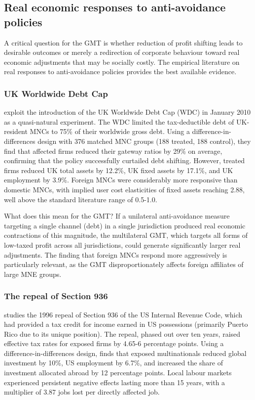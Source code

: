 \documentclass[11pt,a4paper]{article}
\begin{document}
\subsection{Real economic responses to anti-avoidance policies}\label{sec:real}

A critical question for the GMT is whether reduction of profit shifting leads to desirable outcomes or merely a redirection of corporate behaviour toward real economic adjustments that may be socially costly. The empirical literature on real responses to anti-avoidance policies provides the best available evidence.

\subsubsection{UK Worldwide Debt Cap}

\citet{bilicka2022} exploit the introduction of the UK Worldwide Debt Cap (WDC) in January 2010 as a quasi-natural experiment. The WDC limited the tax-deductible debt of UK-resident MNCs to 75\% of their worldwide gross debt. Using a difference-in-differences design with 376 matched MNC groups (188 treated, 188 control), they find that affected firms reduced their gateway ratios by 29\% on average, confirming that the policy successfully curtailed debt shifting. However, treated firms reduced UK total assets by 12.2\%, UK fixed assets by 17.1\%, and UK employment by 3.9\%. Foreign MNCs were considerably more responsive than domestic MNCs, with implied user cost elasticities of fixed assets reaching 2.88, well above the standard literature range of 0.5-1.0.

What does this mean for the GMT? If a unilateral anti-avoidance measure targeting a single channel (debt) in a single jurisdiction produced real economic contractions of this magnitude, the multilateral GMT, which targets all forms of low-taxed profit across all jurisdictions, could generate significantly larger real adjustments. The finding that foreign MNCs respond more aggressively is particularly relevant, as the GMT disproportionately affects foreign affiliates of large MNE groups.

\subsubsection{The repeal of Section 936}

\citet{suarezserrato2019} studies the 1996 repeal of Section 936 of the US Internal Revenue Code, which had provided a tax credit for income earned in US possessions (primarily Puerto Rico due to its unique position). The repeal, phased out over ten years, raised effective tax rates for exposed firms by 4.65-6 percentage points. Using a difference-in-differences design, \citeauthor{suarezserrato2019} finds that exposed multinationals reduced global investment by 10\%, US employment by 6.7\%, and increased the share of investment allocated abroad by 12 percentage points. Local labour markets experienced persistent negative effects lasting more than 15 years, with a multiplier of 3.87 jobs lost per directly affected job. 
\end{document}
